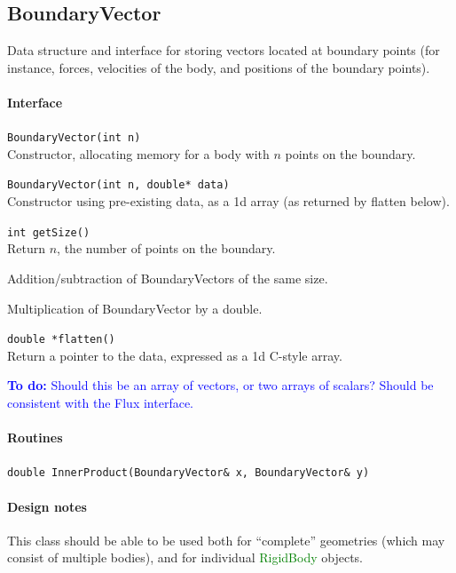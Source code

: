 \documentclass[11pt]{article}
\def\todo#1{\textcolor{blue}{{\bf To do:} #1}}
\def\class#1{\textcolor{green}{\ttfamily\small #1}} %
\def\fn#1{{\ttfamily\small #1}} %
\let\code\lstinline
\begin{document}
\subsection{BoundaryVector}
Data structure and interface for storing vectors located at boundary points (for instance, forces, velocities of the body, and positions of the boundary points).

\paragraph{Interface}
\begin{description}
	\item \code|BoundaryVector(int n)| \\
	Constructor, allocating memory for a body with $n$ points on the boundary.
	\item \code|BoundaryVector(int n, double* data)| \\
	Constructor using pre-existing data, as a 1d array (as returned by \fn{flatten} below).
	\item \code|int getSize()| \\
	Return $n$, the number of points on the boundary.
	\item Addition/subtraction of BoundaryVectors of the same size.
	\item Multiplication of BoundaryVector by a double.
	\item \code|double *flatten()|\\
	Return a pointer to the data, expressed as a 1d C-style array.
\end{description}

\todo{Should this be an array of vectors, or two arrays of scalars?  Should be consistent with the Flux interface.}

\paragraph{Routines}
\begin{description}
	\item \code|double InnerProduct(BoundaryVector& x, BoundaryVector& y)|
\end{description}

\paragraph{Design notes}
This class should be able to be used both for ``complete'' geometries (which may consist of multiple bodies), and for individual \class{RigidBody} objects.
\end{document}
